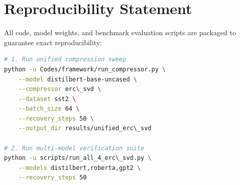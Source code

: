 \section{Reproducibility Statement}
All code, model weights, and benchmark evaluation scripts are packaged to guarantee exact reproducibility:
\begin{lstlisting}[language=bash]
# 1. Run unified compression sweep
python -u Codes/framework/run_compressor.py \
    --model distilbert-base-uncased \
    --compressor erc\_svd \
    --dataset sst2 \
    --batch_size 64 \
    --recovery_steps 50 \
    --output_dir results/unified_erc\_svd

# 2. Run multi-model verification suite
python -u scripts/run_all_4_erc\_svd.py \
    --models distilbert,roberta,gpt2 \
    --recovery_steps 50
\end{lstlisting}
